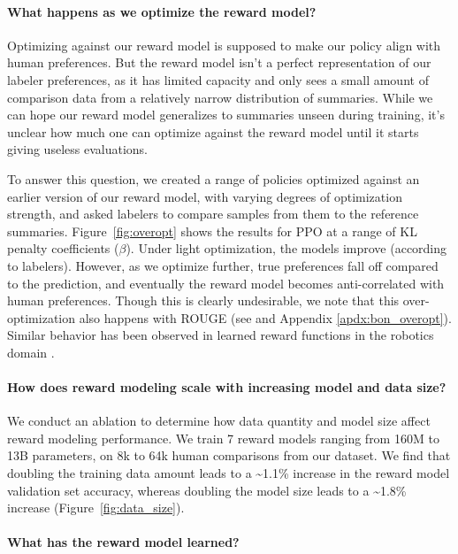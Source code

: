 \paragraph{What happens as we optimize the reward model?} 
\label{sec:overopt}

Optimizing against our reward model is supposed to make our policy align with human preferences. But the reward model isn’t a perfect representation of our labeler preferences, as it has limited capacity and only sees a small amount of comparison data from a relatively narrow distribution of summaries. While we can hope our reward model generalizes to summaries unseen during training, it’s unclear how much one can optimize against the reward model until it starts giving useless evaluations. 

To answer this question, we created a range of policies optimized against an earlier version of our reward model, with varying degrees of optimization strength, and asked labelers to compare samples from them to the reference summaries. Figure~\ref{fig:overopt} shows the results for  PPO at a range of KL penalty coefficients ($\beta$). Under light optimization, the models improve (according to labelers). However, as we optimize further, true preferences fall off compared to the prediction, and eventually the reward model becomes anti-correlated with human preferences. Though this is clearly undesirable, we note that this over-optimization also happens with ROUGE (see \cite{paulus2017deep} and Appendix \ref{apdx:bon_overopt}). Similar behavior has been observed in learned reward functions in the robotics domain \cite{cabi2019scaling}.

\paragraph{How does reward modeling scale with increasing model and data size?}
\label{sec:rm_scaling}

We conduct an ablation to determine how data quantity and model size affect reward modeling performance. We train 7 reward models ranging from 160M to 13B parameters, on 8k to 64k human comparisons from our dataset. We find that doubling the training data amount leads to a \textasciitilde 1.1\% increase in the reward model validation set accuracy, whereas doubling the model size leads to a \textasciitilde 1.8\% increase (Figure~\ref{fig:data_size}). 

\paragraph{What has the reward model learned?}
\label{sec:rm_evals}

